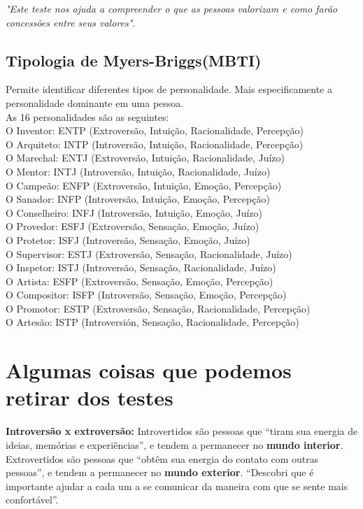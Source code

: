 \documentclass[a4paper, 12pt]{article}
\begin{document}
\textit{"Este teste nos ajuda a compreender o que as pessoas valorizam e como farão concessões entre seus valores"}.

\subsection{Tipologia de Myers-Briggs(MBTI)}
Permite identificar diferentes tipos de personalidade. Mais especificamente a personalidade dominante em uma pessoa.\\

As 16 personalidades são as seguintes:\\
O Inventor: ENTP (Extroversão, Intuição, Racionalidade, Percepção)\\
O Arquiteto: INTP (Introversão, Intuição, Racionalidade, Percepção)\\
O Marechal: ENTJ (Extroversão, Intuição, Racionalidade, Juízo)\\
O Mentor: INTJ (Introversão, Intuição, Racionalidade, Juízo)\\
O Campeão: ENFP (Extroversão, Intuição, Emoção, Percepção)\\
O Sanador: INFP (Introversão, Intuição, Emoção, Percepção)\\
O Conselheiro: INFJ (Introversão, Intuição, Emoção, Juízo)\\
O Provedor: ESFJ (Extroversão, Sensação, Emoção, Juízo)\\
O Protetor: ISFJ (Introversão, Sensação, Emoção, Juízo)\\
O Supervisor: ESTJ (Extroversão, Sensação, Racionalidade, Juízo)\\
O Inspetor: ISTJ (Introversão, Sensação, Racionalidade, Juízo)\\
O Artista: ESFP (Extroversão, Sensação, Emoção, Percepção)\\
O Compositor: ISFP (Introversão, Sensação, Emoção, Percepção)\\
O Promotor: ESTP (Extroversão, Sensação, Racionalidade, Percepção)\\
O Artesão: ISTP (Introversión, Sensação, Racionalidade, Percepção)

\section{Algumas coisas que podemos retirar dos testes}
\textbf{Introversão x extroversão:} Introvertidos são pessoas que “tiram sua energia de ideias, memórias e experiências”, e tendem a permanecer no \textbf{mundo interior}.
Extrovertidos são pessoas que “obtêm sua energia do contato com outras pessoas”, e tendem a permanecer no \textbf{mundo exterior}. 
“Descobri que é importante ajudar a cada um a se comunicar da maneira com que se sente mais confortável”.\\
\end{document}
